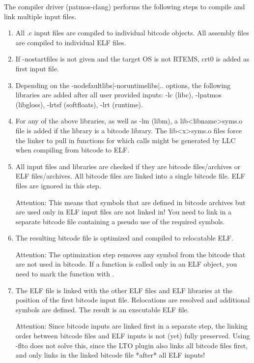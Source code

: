 The compiler driver (patmos-clang) performs the following steps to compile and link multiple input files.

\begin{enumerate}
\item All .c input files are compiled to individual bitcode objects. All assembly files are compiled to
   individual ELF files.

\item If -nostartfiles is not given and the target OS is not RTEMS, crt0 is added as first input file.

\item Depending on the -nodefaultlibs|-noruntimelibs|.. options, the following libraries are added
   after all user provided inputs: -lc (libc), -lpatmos (libgloss), -lrtsf (softfloats), -lrt (runtime).

\item For any of the above libraries, as well as -lm (libm), a lib<libname>syms.o file is added if the library
   is a bitcode library. The lib<x>syms.o files force the linker to pull in functions for which calls might be
   generated by LLC when compiling from bitcode to ELF.

\item All input files and libraries are checked if they are bitcode files/archives or ELF files/archives. All
   bitcode files are linked into a single bitcode file. ELF files are ignored in this step.

Attention: This means that symbols that are defined in bitcode archives but are used only in ELF input files
   are not linked in! You need to link in a separate bitcode file containing a pseudo use of the required symbols.

\item The resulting bitcode file is optimized and compiled to relocatable ELF.

Attention: The optimization step removes any symbol from the bitcode that are not used in bitcode.
   If a function is called only in an ELF object, you need to mark the function with .

\item The ELF file is linked with the other ELF files and ELF libraries at the position of the first bitcode input file.
   Relocations are resolved and additional symbols are defined. The result is an executable ELF file.

Attention: Since bitcode inputs are linked first in a separate step, the linking order between bitcode files
   and ELF inputs is not (yet) fully preserved. Using -flto does not solve this, since the LTO plugin also
   links all bitcode files first, and only links in the linked bitcode file *after* all ELF inputs!

\end{enumerate}

